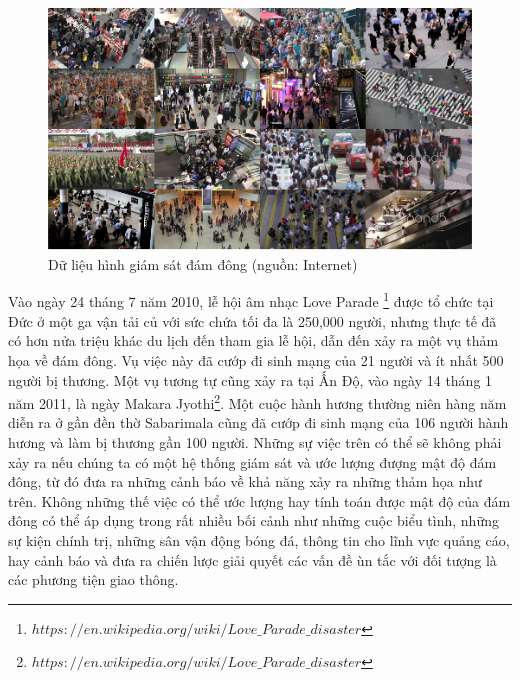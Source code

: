 \begin{figure}[ht]
  			\begin{center}
    				\includegraphics[scale=0.7]{damdong} 
    				\caption{Dữ liệu hình giám sát đám đông (nguồn: Internet)} 
    				\label{damdong}
  			\end{center}
\end{figure}	
	 Vào ngày 24 tháng 7 năm 2010, lễ hội âm nhạc Love Parade \footnote{$https://en.wikipedia.org/wiki/Love\_Parade\_disaster$} được tổ chức tại Đức ở một ga vận tải củ với sức chứa tối đa là 250,000 người, nhưng thực tế đã có hơn nửa triệu khác du lịch đến tham gia lễ hội, dẫn đến xảy ra một vụ thảm họa về đám đông. Vụ việc này đã cướp đi sinh mạng của 21 người và ít nhất 500 người bị thương. Một vụ tương tự cũng xảy ra tại Ấn Độ, vào ngày 14 tháng 1 năm 2011, là ngày Makara Jyothi\footnote{$https://en.wikipedia.org/wiki/Love\_Parade\_disaster$}. Một cuộc hành hương thường niên hàng năm diễn ra ở gần đền thờ Sabarimala cũng đã cướp đi sinh mạng của 106 người hành hương và làm bị thương gần 100 người. Những sự việc trên có thể sẽ không phải xảy ra nếu chúng ta có một hệ thống giám sát và ước lượng đượng mật độ đám đông, từ đó đưa ra những cảnh báo về khả năng xảy ra những thảm họa như trên. Không những thế  việc có thể ước lượng hay tính toán được mật độ của đám đông có thể áp dụng trong rất nhiều bối cảnh như những cuộc biểu tình, những sự kiện chính trị, những sân vận động bóng đá, thông tin cho lĩnh vực quảng cáo, hay cảnh báo và đưa ra chiến lược giải quyết các vấn đề ùn tắc với đối tượng là các phương tiện giao thông. \par
